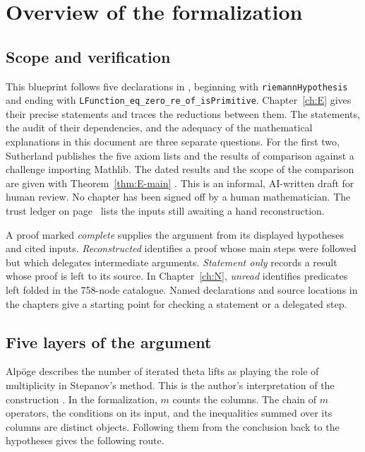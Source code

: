 
\chapter{Overview of the formalization}\label{ch:O}

\section*{Scope and verification}
This blueprint follows five declarations in , beginning with
\texttt{riemannHypothesis} and ending with \texttt{LFunction\_eq\_zero\_re\_of\_isPrimitive}.
Chapter~\ref{ch:E} gives their precise statements and traces the reductions between them.
The statements, the audit of their dependencies, and the adequacy of the mathematical explanations
in this document are three separate questions. For the first two, Sutherland publishes the
five axiom lists and the results of comparison against a challenge importing Mathlib. The
dated results and the scope of the comparison are given with Theorem~\ref{thm:E-main}
\cite{E-Sutherland}. This is an informal, AI-written draft for human review.
No chapter has been signed off by a human mathematician. The trust ledger on page~\pageref{ch:trust} lists the inputs still awaiting a hand reconstruction.

A proof marked \emph{complete} supplies the argument from its displayed hypotheses and cited
inputs. \emph{Reconstructed} identifies a proof whose main steps were followed but which
delegates intermediate arguments. \emph{Statement only} records a result whose proof is left
to its source. In Chapter~\ref{ch:N}, \emph{unread} identifies predicates left folded in the
758-node catalogue. Named declarations and source locations in the chapters give a starting
point for checking a statement or a delegated step.

\section*{Five layers of the argument}

Alp\"oge describes the number of iterated theta lifts as playing the role of multiplicity in
Stepanov's method. This is the author's interpretation of the construction \cite{O-remark}.
In the formalization, $m$ counts the columns. The chain of $m$ operators, the conditions on
its input, and the inequalities summed over its columns are distinct objects. Following them
from the conclusion back to the hypotheses gives the following route.

